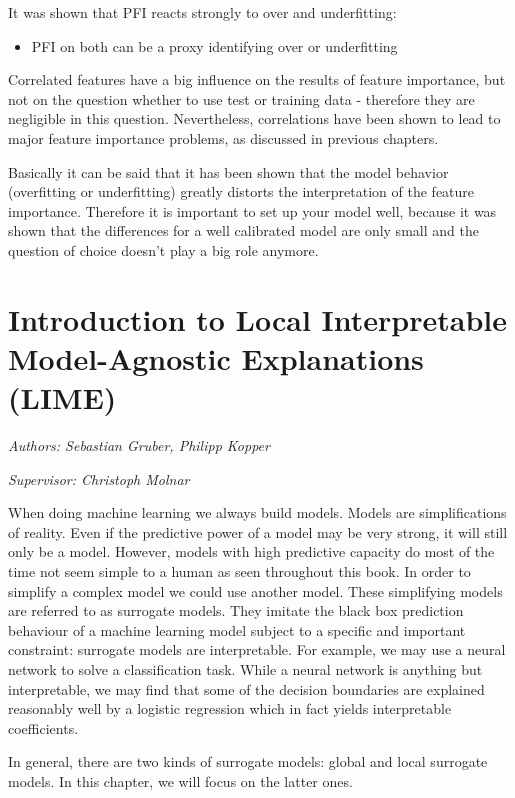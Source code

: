 \documentclass[]{krantz}
\providecommand{\tightlist}{%
  \setlength{\itemsep}{0pt}\setlength{\parskip}{0pt}}
\begin{document}
It was shown that PFI reacts strongly to over and underfitting:

\begin{itemize}
\tightlist
\item
  PFI on both can be a proxy identifying over or underfitting
\end{itemize}

Correlated features have a big influence on the results of feature
importance, but not on the question whether to use test or training data
- therefore they are negligible in this question. Nevertheless,
correlations have been shown to lead to major feature importance
problems, as discussed in previous chapters.

Basically it can be said that it has been shown that the model behavior
(overfitting or underfitting) greatly distorts the interpretation of the
feature importance. Therefore it is important to set up your model well,
because it was shown that the differences for a well calibrated model
are only small and the question of choice doesn't play a big role
anymore.

\chapter{Introduction to Local Interpretable Model-Agnostic Explanations
(LIME)}\label{lime}

\emph{Authors: Sebastian Gruber, Philipp Kopper}

\emph{Supervisor: Christoph Molnar}

When doing machine learning we always build models. Models are
simplifications of reality. Even if the predictive power of a model may
be very strong, it will still only be a model. However, models with high
predictive capacity do most of the time not seem simple to a human as
seen throughout this book. In order to simplify a complex model we could
use another model. These simplifying models are referred to as surrogate
models. They imitate the black box prediction behaviour of a machine
learning model subject to a specific and important constraint: surrogate
models are interpretable. For example, we may use a neural network to
solve a classification task. While a neural network is anything but
interpretable, we may find that some of the decision boundaries are
explained reasonably well by a logistic regression which in fact yields
interpretable coefficients.

In general, there are two kinds of surrogate models: global and local
surrogate models. In this chapter, we will focus on the latter ones.
\end{document}
